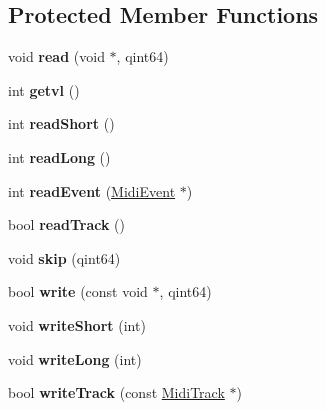 \subsection*{Protected Member Functions}
\begin{DoxyCompactItemize}
\item 
\mbox{\label{class_midi_file_af1925aeaf05cc9a4577311db1b1114ae}} 
void {\bfseries read} (void $\ast$, qint64)
\item 
\mbox{\label{class_midi_file_ac7cc609e1b398dc33c42a8c902ac2608}} 
int {\bfseries getvl} ()
\item 
\mbox{\label{class_midi_file_aaf8046d0a5e8da4ad02f52fca895f3f5}} 
int {\bfseries read\+Short} ()
\item 
\mbox{\label{class_midi_file_aedd3144615cf104d0a05f82583b9a9de}} 
int {\bfseries read\+Long} ()
\item 
\mbox{\label{class_midi_file_aafdb5191d57e8405a1f6d41af6f119c2}} 
int {\bfseries read\+Event} (\hyperlink{class_midi_event}{Midi\+Event} $\ast$)
\item 
\mbox{\label{class_midi_file_a3a125b39fb645a5576a97f889cceba30}} 
bool {\bfseries read\+Track} ()
\item 
\mbox{\label{class_midi_file_afe2f0f15effd198649ec822fa99888a6}} 
void {\bfseries skip} (qint64)
\item 
\mbox{\label{class_midi_file_a96c6082dae7dffc86ee0d173a700c14b}} 
bool {\bfseries write} (const void $\ast$, qint64)
\item 
\mbox{\label{class_midi_file_a70e964adc1025404111aaa47336a89a9}} 
void {\bfseries write\+Short} (int)
\item 
\mbox{\label{class_midi_file_a34977bbb6e6a998f577de3009c901301}} 
void {\bfseries write\+Long} (int)
\item 
\mbox{\label{class_midi_file_aaed701c6575337afd00d2acc01dcdba1}} 
bool {\bfseries write\+Track} (const \hyperlink{class_midi_track}{Midi\+Track} $\ast$)

\end{DoxyCompactItemize}
